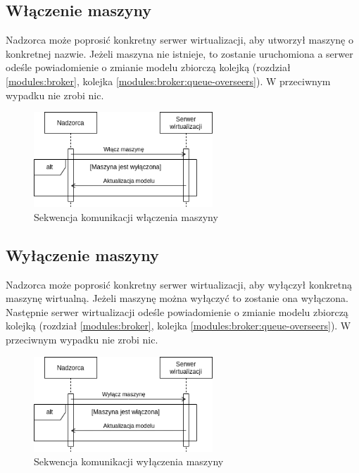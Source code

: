 \documentclass[../opis-rozwiazania.tex]{subfiles}
\begin{document}
\subsection{Włączenie maszyny}

Nadzorca może poprosić konkretny serwer wirtualizacji, aby utworzył maszynę o konkretnej nazwie.
Jeżeli maszyna nie istnieje, to zostanie uruchomiona a serwer odeśle powiadomienie o zmianie modelu zbiorczą kolejką (rozdział \ref{modules:broker}, kolejka \ref{modules:broker:queue-overseers}).
W przeciwnym wypadku nie zrobi nic.

\begin{figure}[ht!]
  \centering
  \includegraphics[width=0.6\textwidth]{../diagrams/sequence_diagrams/wlaczenie_maszyny.png}
  \caption{Sekwencja komunikacji włączenia maszyny}
  \label{figure:diagrams:sequence_diagrams:wlaczenie_maszyny}
\end{figure}

\subsection{Wyłączenie maszyny}

Nadzorca może poprosić konkretny serwer wirtualizacji, aby wyłączył konkretną maszynę wirtualną.
Jeżeli maszynę można wyłączyć to zostanie ona wyłączona.
Następnie serwer wirtualizacji odeśle powiadomienie o zmianie modelu zbiorczą kolejką (rozdział \ref{modules:broker}, kolejka \ref{modules:broker:queue-overseers}).
W przeciwnym wypadku nie zrobi nic.

\begin{figure}[ht!]
  \centering
  \includegraphics[width=0.6\textwidth]{../diagrams/sequence_diagrams/wylaczenie_maszyny.png}
  \caption{Sekwencja komunikacji wyłączenia maszyny}
  \label{figure:diagrams:sequence_diagrams:wylaczenie_maszyny}
\end{figure}
\end{document}
